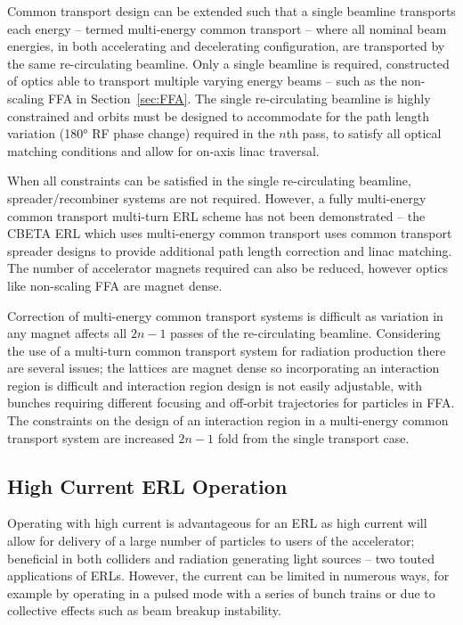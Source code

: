 \documentclass[../main.tex]{subfiles}
\begin{document}
Common transport design can be extended such that a single beamline transports each energy -- termed multi-energy common transport -- where all nominal beam energies, in both accelerating and decelerating configuration, are transported by the same re-circulating beamline. Only a single beamline is required, constructed of optics able to transport multiple varying energy beams -- such as the non-scaling FFA in Section~\ref{sec:FFA}. The single re-circulating beamline is highly constrained and orbits must be designed to accommodate for the path length variation (180\si{\degree} RF phase change) required in the $n$th pass, to satisfy all optical matching conditions and allow for on-axis linac traversal. 

When all constraints can be satisfied in the single re-circulating beamline, spreader/recombiner systems are not required. However, a fully multi-energy common transport multi-turn ERL scheme has not been demonstrated -- the CBETA ERL \cite{hoffstaetter2017cbeta,bartnik2020cbeta} which uses multi-energy common transport uses common transport spreader designs to provide additional path length correction and linac matching. The number of accelerator magnets required can also be reduced, however optics like non-scaling FFA are magnet dense.

Correction of multi-energy common transport systems is difficult as variation in any magnet affects all $2n-1$ passes of the re-circulating beamline. Considering the use of a multi-turn common transport system for radiation production there are several issues; the lattices are magnet dense so incorporating an interaction region is difficult and interaction region design is not easily adjustable, with bunches requiring different focusing and off-orbit trajectories for particles in FFA. The constraints on the design of an interaction region in a multi-energy common transport system are increased $2n-1$ fold from the single transport case.   

\subsection{High Current ERL Operation}

Operating with high current is advantageous for an ERL as high current will allow for delivery of a large number of particles to users of the accelerator; beneficial in both colliders and radiation generating light sources -- two touted applications of ERLs. However, the current can be limited in numerous ways, for example by operating in a pulsed mode with a series of bunch trains or due to collective effects such as beam breakup instability. 
\end{document}
